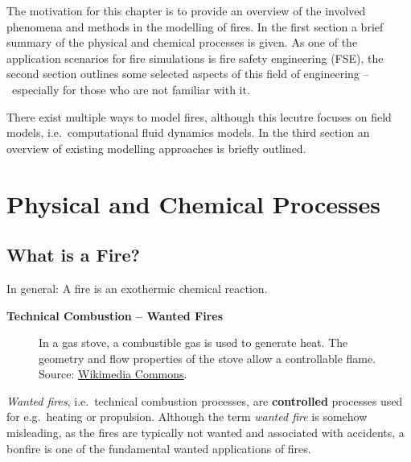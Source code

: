 \documentclass[
  letterpaper,
  DIV=11,
  numbers=noendperiod]{scrreprt}
\begin{document}
The motivation for this chapter is to provide an overview of the
involved phenomena and methods in the modelling of fires. In the first
section a brief summary of the physical and chemical processes is given.
As one of the application scenarios for fire simulations is fire safety
engineering (FSE), the second section outlines some selected aspects of
this field of engineering --~especially for those who are not familiar
with it.

There exist multiple ways to model fires, although this lecutre focuses
on field models, i.e.~computational fluid dynamics models. In the third
section an overview of existing modelling approaches is briefly
outlined.

\section{Physical and Chemical
Processes}\label{physical-and-chemical-processes}

\subsection{What is a Fire?}\label{what-is-a-fire}

In general: A fire is an exothermic chemical reaction.

\textbf{Technical Combustion -- Wanted Fires}

\begin{figure}


\caption{\label{fig-wanted-fire}In a gas stove, a combustible gas is
used to generate heat. The geometry and flow properties of the stove
allow a controllable flame. Source:
\href{https://commons.wikimedia.org/wiki/File:Gas_flame.jpg}{Wikimedia
Commons}.}

\end{figure}%

\emph{Wanted fires}, i.e.~technical combustion processes, are
\textbf{controlled} processes used for e.g.~heating or propulsion.
Although the term \emph{wanted fire} is somehow misleading, as the fires
are typically not wanted and associated with accidents, a bonfire is one
of the fundamental wanted applications of fires.
\end{document}
